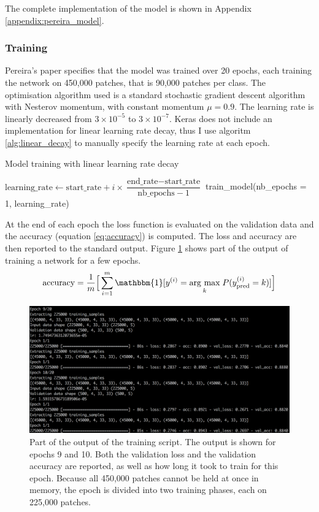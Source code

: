\documentclass[12pt,a4paper,twoside,openright]{report}
\newcommand{\argmax}[1]{\underset{#1}{\operatorname{arg}\,\operatorname{max}}\;} %
\begin{document}
The complete implementation of the model is shown in Appendix \ref{appendix:pereira_model}. 

\subsubsection{Training}
Pereira's paper specifies that the model was trained over 20 epochs, each training the network on 450,000 patches, that is 90,000 patches per class. The optimisation algorithm used is a standard stochastic gradient descent algorithm with Nesterov momentum, with constant momentum $\mu = 0.9$. The learning rate is linearly decreased from $3 \times 10^{-5}$ to $3 \times 10^{-7}$. Keras does not include an implementation for linear learning rate decay, thus I use algoritm \ref{alg:linear_decay} to manually specify the learning rate at each epoch.

\begin{algorithm}
\caption{Model training with linear learning rate decay}
\label{alg:linear_decay}
\begin{algorithmic}[1]
	\State $\text{learning\_rate} \gets \text{start\_rate} + i \times \dfrac{\text{end\_rate} - \text{start\_rate} }{ \text{nb\_epochs} - 1 }$
	\State train\_model(nb\_epochs = 1, learning\_rate)
\EndFor
\end{algorithmic}
\end{algorithm}

At the end of each epoch the loss function is evaluated on the validation data and the accuracy (equation \ref{eq:accuracy}) is computed. The loss and accuracy are then reported to the standard output. Figure \ref{fig:training_output} shows part of the output of training a network for a few epochs.
\begin{equation}
	\label{eq:accuracy}
		\text{accuracy} = 
	\frac{1}{m}\Big[\sum_{i=1}^m\mathbbm{1}[y^{(i)} = \argmax{k}P(y_{\text{pred}}^{(i)}=k)]\Big]
\end{equation}
\begin{figure}
	\centering
	\includegraphics[width=\textwidth]{training_output}
	\caption[Part of the output of the training script.]{Part of the output of the training script. The output is shown for epochs 9 and 10. Both the validation loss and the validation accuracy are reported, as well as how long it took to train for this epoch. Because all 450,000 patches cannot be held at once in memory, the epoch is divided into two training phases, each on 225,000 patches.}
	\label{fig:training_output}
\end{figure}
\end{document}
